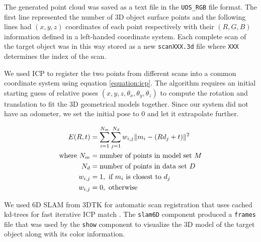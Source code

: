 The generated point cloud was saved as a text file in the \texttt{UOS\_RGB} file format. The first line represented the number of 3D object surface points and the following lines had $(x, y, z)$ coordinates of each point respectively with their $(R, G, B)$ information defined in a left-handed coordinate system. 
Each complete scan of the target object was in this way stored as a new \texttt{scanXXX.3d} file where \texttt{XXX} determines the index of the scan. 

We used \ac{ICP} \cite{besl:1992} to register the two points from different scans into a common coordinate system using equation \ref{equation:icp}. The algorithm requires an initial starting guess of relative poses $(x, y, z, \theta_x, \theta_y, \theta_z)$ to compute the rotation and translation to fit the 3D geometrical models together. Since our system did not have an odometer, we set the initial pose to 0 and let it extrapolate further. 

\begin{align}
	\label{equation:icp}				
	E(R, t) &= \sum_{i=1}^{N_m} \sum_{j=1}^{N_d} w_{i,j}\| m_i - (Rd_j + t) \|^2 \notag \\
	\text{where}~ N_m &= \text{number of points in model set}~ M \notag \\
						N_d &= \text{number of points in data set}~ D \notag \\
						w_{i,j} &= 1, ~\text{if}~ m_i~ \text{is closest to}~	d_j \notag \\
						w_{i,j} &= 0, ~\text{otherwise}
\end{align}

We used 6D \ac{SLAM} from \ac{3DTK} \cite{3dtk:2012} for automatic scan registration that uses cached kd-trees for fast iterative \ac{ICP} match \cite{nuchter:2007}. The \texttt{slam6D} component produced a \texttt{frames} file that was used by the \texttt{show} component to visualize the 3D model of the target object along with its color information.